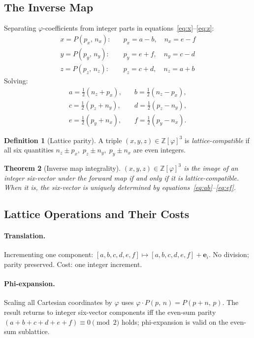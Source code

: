 \documentclass[12pt]{article}
\newtheorem{theorem}{Theorem}[section]
\theoremstyle{definition}
\newtheorem{definition}[theorem]{Definition}
\theoremstyle{remark}
\newcommand{\Zphi}{\mathbb{Z}[\varphi]}
\newcommand{\Phib}[2]{P(#1,\,#2)}
\begin{document}
\subsection{The Inverse Map}
Separating $\varphi$-coefficients from integer parts in
equations~\eqref{eq:x}--\eqref{eq:z}:
\begin{align}
  x=\Phib{p_x}{n_x}: &\quad p_x=a-b,\quad n_x=e-f \label{eq:xpn}\\
  y=\Phib{p_y}{n_y}: &\quad p_y=e+f,\quad n_y=c-d \label{eq:ypn}\\
  z=\Phib{p_z}{n_z}: &\quad p_z=c+d,\quad n_z=a+b \label{eq:zpn}
\end{align}
Solving:
\begin{align}
  a=\tfrac12(n_z+p_x),&\quad b=\tfrac12(n_z-p_x), \label{eq:ab}\\
  c=\tfrac12(p_z+n_y),&\quad d=\tfrac12(p_z-n_y), \label{eq:cd}\\
  e=\tfrac12(p_y+n_x),&\quad f=\tfrac12(p_y-n_x). \label{eq:ef}
\end{align}
\begin{definition}[Lattice parity]
A triple $(x,y,z)\in\Zphi^3$ is \emph{lattice-compatible} if all six
quantities $n_z\pm p_x,\; p_z\pm n_y,\; p_y\pm n_x$ are even integers.
\end{definition}
\begin{theorem}[Inverse map integrality]
\label{thm:inverse}
$(x,y,z)\in\Zphi^3$ is the image of an integer six-vector under the
forward map if and only if it is lattice-compatible.  When it is, the
six-vector is uniquely determined by
equations~\eqref{eq:ab}--\eqref{eq:ef}.
\end{theorem}
\subsection{Lattice Operations and Their Costs}
\paragraph{Translation.}
Incrementing one component: $[a,b,c,d,e,f]\mapsto[a,b,c,d,e,f]+\mathbf{e}_i$.
No division; parity preserved.  Cost: one integer increment.
\paragraph{Phi-expansion.}
Scaling all Cartesian coordinates by $\varphi$ uses
$\varphi\cdot\Phib{p}{n}=\Phib{p+n}{p}$.  The result returns to
integer six-vector components iff the even-sum parity
$(a+b+c+d+e+f)\equiv 0\pmod{2}$ holds; phi-expansion is valid on
the even-sum sublattice.
\end{document}

